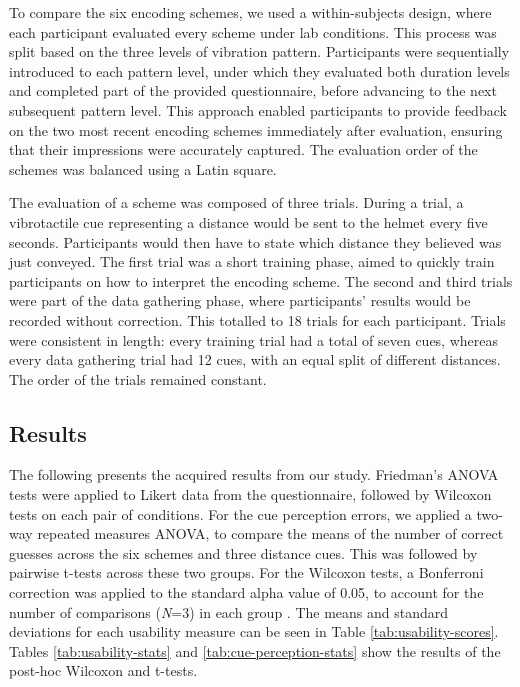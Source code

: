 \documentclass{mpaper}
\begin{document}
To compare the six encoding schemes, we used a within-subjects design, where each participant evaluated every scheme under lab conditions. This process was split based on the three levels of vibration pattern. Participants were sequentially introduced to each pattern level, under which they evaluated both duration levels and completed part of the provided questionnaire, before advancing to the next subsequent pattern level. This approach enabled participants to provide feedback on the two most recent encoding schemes immediately after evaluation, ensuring that their impressions were accurately captured. The evaluation order of the schemes was balanced using a Latin square.

The evaluation of a scheme was composed of three trials. During a trial, a vibrotactile cue representing a distance would be sent to the helmet every five seconds. Participants would then have to state which distance they believed was just conveyed. The first trial was a short training phase, aimed to quickly train participants on how to interpret the encoding scheme. The second and third trials were part of the data gathering phase, where participants' results would be recorded without correction. This totalled to 18 trials for each participant. Trials were consistent in length: every training trial had a total of seven cues, whereas every data gathering trial had 12 cues, with an equal split of different distances. The order of the trials remained constant.


\subsection{Results}
The following presents the acquired results from our study. Friedman's ANOVA tests were applied to Likert data from the questionnaire, followed by Wilcoxon tests on each pair of conditions. For the cue perception errors, we applied a two-way repeated measures ANOVA, to compare the means of the number of correct guesses across the six schemes and three distance cues. This was followed by pairwise t-tests across these two groups. For the Wilcoxon tests, a Bonferroni correction was applied to the standard alpha value of 0.05, to account for the number of comparisons (\textit{N}=3) in each group \cite{Armstrong2014-vr}. The means and standard deviations for each usability measure can be seen in Table \ref{tab:usability-scores}. Tables \ref{tab:usability-stats} and \ref{tab:cue-perception-stats} show the results of the post-hoc Wilcoxon and t-tests.
\end{document}
